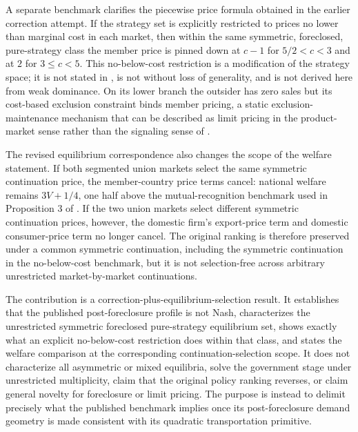 A separate benchmark clarifies the piecewise price formula obtained in the earlier correction attempt. If the strategy set is explicitly restricted to prices no lower than marginal cost in each market, then within the same symmetric, foreclosed, pure-strategy class the member price is pinned down at $c-1$ for $5/2<c<3$ and at $2$ for $3\leq c<5$. This no-below-cost restriction is a modification of the strategy space; it is not stated in \citet{gandalshy2001}, is not without loss of generality, and is not derived here from weak dominance. On its lower branch the outsider has zero sales but its cost-based exclusion constraint binds member pricing, a static exclusion-maintenance mechanism that can be described as limit pricing in the product-market sense rather than the signaling sense of \citet{milgromroberts1982}.

The revised equilibrium correspondence also changes the scope of the welfare statement. If both segmented union markets select the same symmetric continuation price, the member-country price terms cancel: national welfare remains $3V+1/4$, one half above the mutual-recognition benchmark used in Proposition 3 of \citet{gandalshy2001}. If the two union markets select different symmetric continuation prices, however, the domestic firm's export-price term and domestic consumer-price term no longer cancel. The original ranking is therefore preserved under a common symmetric continuation, including the symmetric continuation in the no-below-cost benchmark, but it is not selection-free across arbitrary unrestricted market-by-market continuations.

The contribution is a correction-plus-equilibrium-selection result. It establishes that the published post-foreclosure profile is not Nash, characterizes the unrestricted symmetric foreclosed pure-strategy equilibrium set, shows exactly what an explicit no-below-cost restriction does within that class, and states the welfare comparison at the corresponding continuation-selection scope. It does not characterize all asymmetric or mixed equilibria, solve the government stage under unrestricted multiplicity, claim that the original policy ranking reverses, or claim general novelty for foreclosure or limit pricing. The purpose is instead to delimit precisely what the published benchmark implies once its post-foreclosure demand geometry is made consistent with its quadratic transportation primitive.
